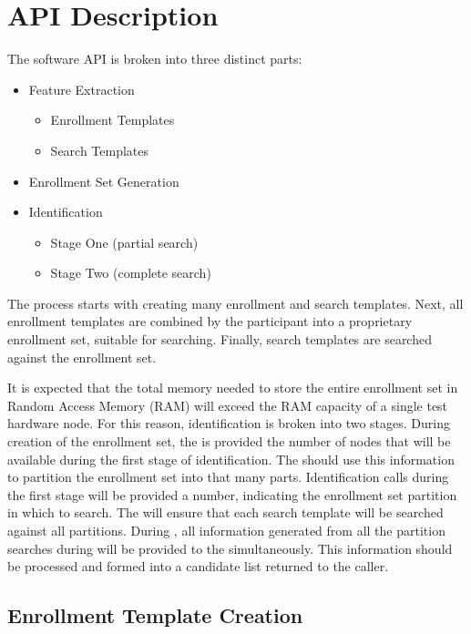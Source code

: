 \section{API Description}

The \project software API is broken into three distinct parts:
\begin{itemize}
	\item Feature Extraction
		\begin{itemize}
			\item Enrollment Templates
			\item Search Templates
		\end{itemize}
	\item Enrollment Set Generation
	\item Identification
		\begin{itemize}
			\item Stage One (partial search)
			\item Stage Two (complete search)
		\end{itemize}
\end{itemize}

The process starts with creating many enrollment and search templates. Next, all
enrollment templates are combined by the participant into a proprietary
enrollment set, suitable for searching. Finally, search templates are searched
against the enrollment set.

It is expected that the total memory needed to store the entire enrollment set
in Random Access Memory (RAM) will exceed the RAM capacity of a single test
hardware node. For this reason, identification is broken into two stages.
During creation of the enrollment set, the \implementation is provided the
number of nodes that will be available during the first stage of
identification. The \implementation should use this information to partition
the enrollment set into that many parts.  Identification calls during the first
stage will be provided a number, indicating the enrollment set partition in
which to search. The \testdriver will ensure that each search template will be
searched against all partitions. During \stagetwoidentification, all
information generated from all the partition searches during
\stageoneidentification will be provided to the \implementation simultaneously.
This information should be processed and formed into a candidate list returned
to the caller.

\subsection{Enrollment Template Creation}
\label{subsec:api-enrollment_template}

